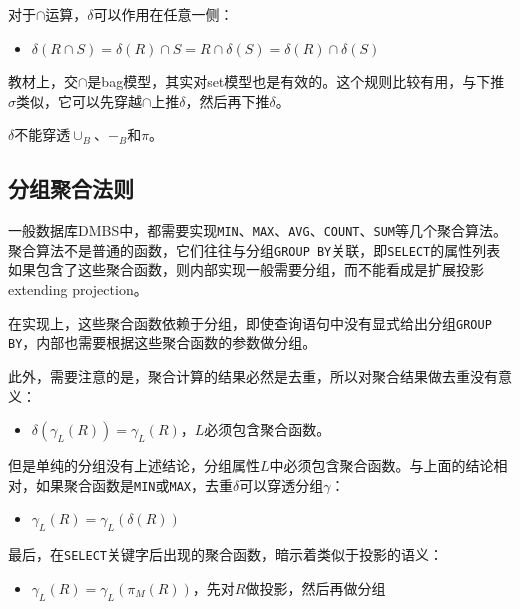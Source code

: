对于$\cap$运算，$\delta$可以作用在任意一侧：
\begin{itemize}
    \item $\delta(R \cap S) = \delta(R) \cap S = R \cap \delta(S) = \delta(R) \cap \delta(S)$
\end{itemize}
教材上，交$\cap$是bag模型，其实对set模型也是有效的。这个规则比较有用，与下推$\sigma$类似，它可以先穿越$\cap$上推$\delta$，然后再下推$\delta$。

$\delta$不能穿透$\cup_B$、$-_B$和$\pi$。

\subsection{分组聚合法则}

一般数据库DMBS中，都需要实现\texttt{MIN}、\texttt{MAX}、\texttt{AVG}、\texttt{COUNT}、\texttt{SUM}等几个聚合算法。聚合算法不是普通的函数，它们往往与分组\texttt{GROUP BY}关联，即\texttt{SELECT}的属性列表如果包含了这些聚合函数，则内部实现一般需要分组，而不能看成是扩展投影extending projection。

在实现上，这些聚合函数依赖于分组，即使查询语句中没有显式给出分组\texttt{GROUP BY}，内部也需要根据这些聚合函数的参数做分组。

此外，需要注意的是，聚合计算的结果必然是去重，所以对聚合结果做去重没有意义：
\begin{itemize}
    \item $\delta(\gamma_L(R)) = \gamma_L(R)$，$L$必须包含聚合函数。
\end{itemize}

但是单纯的分组没有上述结论，分组属性$L$中必须包含聚合函数。与上面的结论相对，如果聚合函数是\texttt{MIN}或\texttt{MAX}，去重$\delta$可以穿透分组$\gamma$：
\begin{itemize}
    \item $\gamma_L(R) = \gamma_L(\delta(R))$
\end{itemize}

最后，在\texttt{SELECT}关键字后出现的聚合函数，暗示着类似于投影的语义：
\begin{itemize}
    \item $\gamma_L(R) = \gamma_L(\pi_M(R))$，先对$R$做投影，然后再做分组
\end{itemize}

